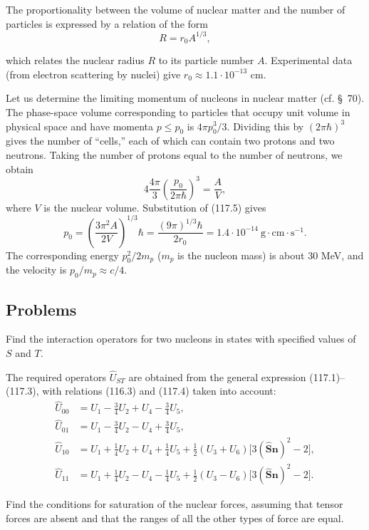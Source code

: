 The proportionality between the volume of nuclear matter and the number of
particles is expressed by a relation of the form
\begin{equation}
 R=r_0A^{1/3},
 \tag{117.5}
\end{equation}

which relates the nuclear radius $R$ to its particle number $A$. Experimental
data (from electron scattering by nuclei) give
$r_0\approx1.1\cdot10^{-13}$ cm.

Let us determine the limiting momentum of nucleons in nuclear matter (cf.
§~70). The phase-space volume corresponding to particles that occupy unit
volume in physical space and have momenta $p\leqslant p_0$ is
$4\pi p_0^3/3$. Dividing this by $(2\pi\hbar)^3$ gives the number of
``cells,'' each of which can contain two protons and two neutrons. Taking the
number of protons equal to the number of neutrons, we obtain
\[
 4\frac{4\pi}{3}\left(\frac{p_0}{2\pi\hbar}\right)^3=\frac AV,
\]
where $V$ is the nuclear volume. Substitution of (117.5) gives
\[
 p_0=\left(\frac{3\pi^2A}{2V}\right)^{1/3}\hbar
 =\frac{(9\pi)^{1/3}\hbar}{2r_0}
 =1.4\cdot10^{-14}\ \text{g}\cdot\text{cm}\cdot\text{s}^{-1}.
\]
The corresponding energy $p_0^2/2m_p$ ($m_p$ is the nucleon mass) is about
$30$ MeV, and the velocity is $p_0/m_p\approx c/4$.

\subsection*{Problems}

 Find the interaction operators for two nucleons in states
with specified values of $S$ and $T$.

\SolutionHeading The required operators $\hat U_{ST}$ are obtained from the
general expression (117.1)--(117.3), with relations (116.3) and (117.4) taken
into account:
\begin{align*}
 \hat U_{00}&=U_1-\frac34U_2+U_4-\frac34U_5,\\
 \hat U_{01}&=U_1-\frac34U_2-U_4+\frac34U_5,\\
 \hat U_{10}&=U_1+\frac14U_2+U_4+\frac14U_5
 +\frac12(U_3+U_6)\bigl[3(\hat{\mathbf S}\mathbf n)^2-2\bigr],\\
 \hat U_{11}&=U_1+\frac14U_2-U_4-\frac14U_5
 +\frac12(U_3-U_6)\bigl[3(\hat{\mathbf S}\mathbf n)^2-2\bigr].
\end{align*}

 Find the conditions for saturation of the nuclear forces,
assuming that tensor forces are absent and that the ranges of all the other
types of force are equal.

